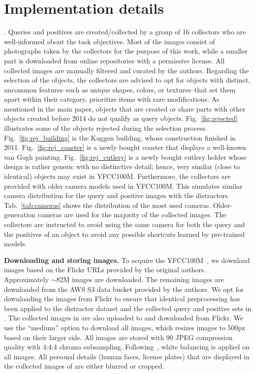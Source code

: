 \appendix
\renewcommand{\thefigure}{\Alph{figure}}
\renewcommand{\thetable}{\Alph{table}}

\section{Implementation details}

. 
Queries and positives are created/collected by a group of 16 collectors who are well-informed about the task objectives. 
Most of the images consist of photographs taken by the collectors for the purpose of this work, while a smaller part is downloaded from online repositories with a permissive license.
All collected images are manually filtered and curated by the authors. Regarding the selection of the objects, the collectors are advised to opt for objects with distinct, uncommon features--such as unique shapes, colors, or textures--that set them apart within their category, \ie prioritize items with rare modifications. 
As mentioned in the main paper, objects that are created or share parts with other objects created before 2014 do not qualify as query objects. Fig.~\ref{fig:rejected} illustrates some of the objects rejected during the selection process. Fig.~\ref{fig:rej_building} is the Kuggen building, whose construction finished in 2011. Fig.~\ref{fig:rej_coaster} is a newly bought coaster that displays a well-known van Gogh painting. Fig.~\ref{fig:rej_cutlery} is a newly bought cutlery holder whose design is rather generic with no distinctive detail; hence, very similar (close to identical) objects may exist in YFCC100M. 
Furthermore, the collectors are provided with older camera models used in YFCC100M. This simulates similar camera distribution for the query and positive images with the distractors. Tab.~\ref{tab:cameras} shows the distribution of the most used cameras. Older-generation cameras are used for the majority of the collected images.
The collectors are instructed to avoid using the same camera for both the query and the positives of an object to avoid any possible shortcuts learned by pre-trained models.

\noindent\textbf{Downloading and storing images.}
To acquire the YFCC100M~\cite{tsf+16}, we download images based on the Flickr URLs provided by the original authors.
Approximately $\sim$82M images are downloaded. The remaining images are downloaded from the AWS S3 data bucket provided by the authors.
We opt for downloading the images from Flickr to ensure that identical preprocessing has been applied to the distractor dataset and the collected query and positive sets in \ours.
The collected images in \ours are also uploaded to and downloaded from Flickr. We use the ``medium'' option to download all images, which resizes images to 500px based on their larger side.
All images are stored with 90 JPEG compression quality with 4:4:4 chroma subsampling. Following~\cite{gonzalez09,ab19}, white balancing is applied on all images.
All personal details (\eg human faces, license plates) that are displayed in the collected images of \ours are either blurred or cropped.

